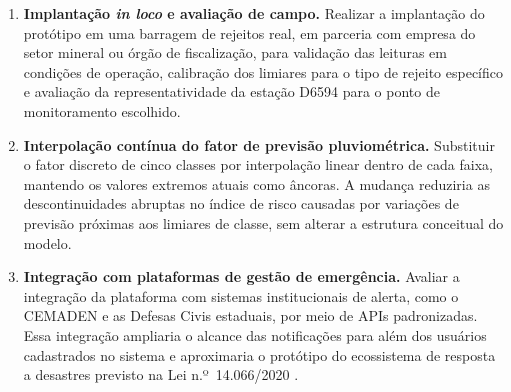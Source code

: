 \begin{enumerate}
  \item \textbf{Implantação \textit{in loco} e avaliação de campo.}
  Realizar a implantação do protótipo em uma barragem de rejeitos
  real, em parceria com empresa do setor mineral ou órgão de
  fiscalização, para validação das leituras em condições de
  operação, calibração dos limiares para o tipo de rejeito
  específico e avaliação da representatividade da estação D6594
  para o ponto de monitoramento escolhido.

  \item \textbf{Interpolação contínua do fator de previsão
  pluviométrica.}
  Substituir o fator discreto de cinco classes por interpolação
  linear dentro de cada faixa, mantendo os valores extremos atuais
  como âncoras. A mudança reduziria as descontinuidades abruptas no
  índice de risco causadas por variações de previsão próximas aos
  limiares de classe, sem alterar a estrutura conceitual do modelo.

  \item \textbf{Integração com plataformas de gestão de emergência.}
  Avaliar a integração da plataforma com sistemas institucionais de
  alerta, como o CEMADEN e as Defesas Civis estaduais, por meio de
  APIs padronizadas. Essa integração ampliaria o alcance das
  notificações para além dos usuários cadastrados no sistema e
  aproximaria o protótipo do ecossistema de resposta a desastres
  previsto na Lei n.º~14.066/2020 \cite{brasil2020lei14066}.

\end{enumerate}